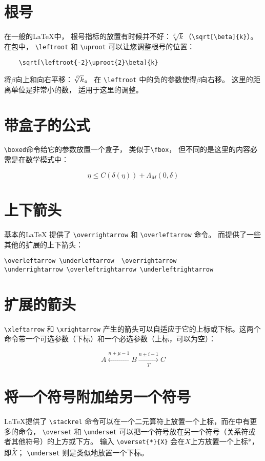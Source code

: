 \section{根号}
在一般的\LaTeX 中，  根号指标的放置有时候并不好：$\sqrt[\beta]{k}$（\verb|\sqrt[\beta]{k}|）。 在包中，  \verb|\leftroot| 和 \verb|\uproot| 可以让您调整根号的位置：
\begin{verbatim}
    \sqrt[\leftroot{-2}\uproot{2}\beta]{k}
\end{verbatim}
将$\beta$向上和向右平移：$\sqrt[\leftroot{-2}\uproot{2}\beta]{k}$。 在 \verb|\leftroot| 中的负的参数使得$\beta$向右移。 这里的距离单位是非常小的数，  适用于这里的调整。

\section{带盒子的公式}
\verb|\boxed|命令给它的参数放置一个盒子，  类似于\verb|\fbox|，  但不同的是这里的内容必需是在数学模式中：
\begin{tcblisting}{}
\begin{equation}
\boxed{\eta\le C(\delta(\eta))+\Lambda_M(0,\delta)}
\end{equation}
\end{tcblisting}

\section{上下箭头}
基本的\LaTeX{} 提供了 \verb|\overrightarrow| 和 \verb|\overleftarrow| 命令。 而提供了一些其他的扩展的上下箭头：
\begin{verbatim}
\overleftarrow \underleftarrow  \overrightarrow
\underrightarrow \overleftrightarrow \underleftrightarrow
\end{verbatim}
\section{扩展的箭头}
\verb|\xleftarrow| 和 \verb|\xrightarrow| 产生的箭头可以自适应于它的上标或下标。这两个命令带一个可选参数（下标）和一个必选参数（上标，可以为空）：
\begin{tcblisting}{}
\begin{equation}
A\xleftarrow{n+\mu-1}B\xrightarrow[T]{n\pm i-1}C
\end{equation}
\end{tcblisting}

\section{将一个符号附加给另一个符号}
\LaTeX 提供了 \verb|\stackrel| 命令可以在一个二元算符上放置一个上标，而在中有更多的命令，  \verb|\overset| 和 \verb|\underset| 可以把一个符号放在另一个符号（关系符或者其他符号）的上方或下方。 输入 \verb|\overset{*}{X}| 会在$X$上方放置一个上标*，  即$\overset{*}{X}$； \verb|\underset| 则是类似地放置一个下标。

